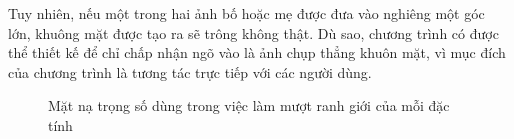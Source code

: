 \documentclass[journal]{IEEEtran}
\begin{document}
Tuy nhiên, nếu một trong hai ảnh bố hoặc mẹ được đưa vào nghiêng một góc lớn, khuông mặt được tạo ra sẽ trông không thật. Dù sao, chương trình có được thể thiết kế để chỉ chấp nhận ngõ vào là ảnh chụp thẳng khuôn mặt, vì mục đích của chương trình là tương tác trực tiếp với các người dùng.

\begin{figure}[!t]
\centering
{}
\label{refhinh4}
\caption{Mặt nạ trọng số dùng trong việc làm mượt ranh giới của mỗi đặc tính}
\end{figure}
\end{document}
